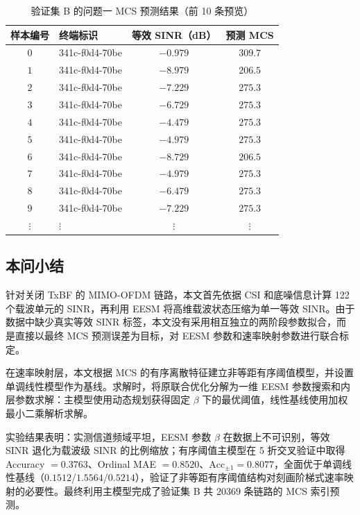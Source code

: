\documentclass[bwprint]{gmcmthesis}
\numberwithin{figure}{section}
\begin{document}
\begin{table}[H]
	\centering
	\caption{验证集 B 的问题一 MCS 预测结果（前 10 条预览）}
	\label{tab:q1-B}
	\begin{tabular}{clcc}
		\toprule
		样本编号 & 终端标识 & 等效 SINR（dB） & 预测 MCS \\
		\midrule
		$0$ & 341c-f0d4-70be & $-0.979$ & $309.7$ \\
		$1$ & 341c-f0d4-70be & $-8.979$ & $206.5$ \\
		$2$ & 341c-f0d4-70be & $-7.229$ & $275.3$ \\
		$3$ & 341c-f0d4-70be & $-6.729$ & $275.3$ \\
		$4$ & 341c-f0d4-70be & $-4.479$ & $275.3$ \\
		$5$ & 341c-f0d4-70be & $-4.979$ & $275.3$ \\
		$6$ & 341c-f0d4-70be & $-8.729$ & $206.5$ \\
		$7$ & 341c-f0d4-70be & $-4.979$ & $275.3$ \\
		$8$ & 341c-f0d4-70be & $-6.479$ & $275.3$ \\
		$9$ & 341c-f0d4-70be & $-7.229$ & $275.3$ \\
		$\vdots$ & $\vdots$ & $\vdots$ & $\vdots$ \\
		\bottomrule
	\end{tabular}
\end{table}

\subsection{本问小结}

针对关闭 TxBF 的 MIMO-OFDM 链路，本文首先依据 CSI 和底噪信息计算 122 个载波单元的 SINR，再利用 EESM 将高维载波状态压缩为单一等效 SINR。由于数据中缺少真实等效 SINR 标签，本文没有采用相互独立的两阶段参数拟合，而是直接以最终 MCS 预测误差为目标，对 EESM 参数和速率映射参数进行联合标定。

在速率映射层，本文根据 MCS 的有序离散特征建立非等距有序阈值模型，并设置单调线性模型作为基线。求解时，将原联合优化分解为一维 EESM 参数搜索和内层参数求解：主模型使用动态规划获得固定 $\beta$ 下的最优阈值，线性基线使用加权最小二乘解析求解。

实验结果表明：实测信道频域平坦，EESM 参数 $\beta$ 在数据上不可识别，等效 SINR 退化为载波级 SINR 的比例缩放；有序阈值主模型在 5 折交叉验证中取得 Accuracy $=0.3763$、Ordinal MAE $=0.8520$、$\mathrm{Acc}_{\pm1}=0.8077$，全面优于单调线性基线（$0.1512$/$1.5564$/$0.5214$），验证了非等距有序阈值结构对刻画阶梯式速率映射的必要性。最终利用主模型完成了验证集 B 共 $20369$ 条链路的 MCS 索引预测。
\end{document}
